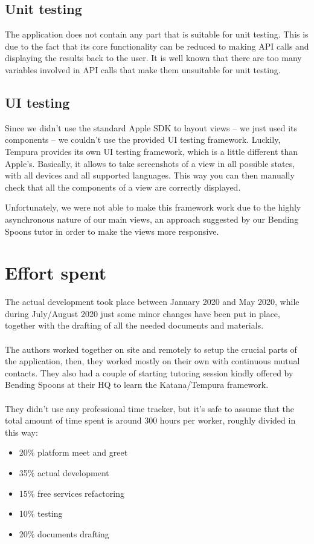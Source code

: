 \documentclass[a4paper, 11pt, parskip=half]{scrreprt}
\theoremstyle{definition}
\begin{document}
\section{Unit testing}

The application does not contain any part that is suitable for unit testing. This is due to the fact that its core functionality can be reduced to making API calls and displaying the results back to the user. It is well known that there are too many variables involved in API calls that make them unsuitable for unit testing.

\section{UI testing}

Since we didn't use the standard Apple SDK to layout views -- we just used its components -- we couldn't use the provided UI testing framework. Luckily, Tempura provides its own UI testing framework, which is a little different than Apple's. Basically, it allows to take screenshots of a view in all possible states, with all devices and all supported languages. This way you can then manually check that all the components of a view are correctly displayed.

Unfortunately, we were not able to make this framework work due to the highly asynchronous nature of our main views, an approach suggested by our Bending Spoons tutor in order to make the views more responsive.




\chapter{Effort spent}

The actual development took place between January 2020 and May 2020, while during July/August 2020 just some minor changes have been put in place, together with the drafting of all the needed documents and materials.
\\\\The authors worked together on site and remotely to setup the crucial parts of the application, then, they worked mostly on their own with continuous mutual contacts. They also had a couple of starting tutoring session kindly offered by Bending Spoons at their HQ to learn the Katana/Tempura framework.
\\\\They didn't use any professional time tracker, but it's safe to assume that the total amount of time spent is around 300 hours per worker, roughly divided in this way:

\begin{itemize}
	\item 20\% platform meet and greet
	\item 35\% actual development
	\item 15\% free services refactoring
	\item 10\% testing
	\item 20\% documents drafting
\end{itemize}
\end{document}
